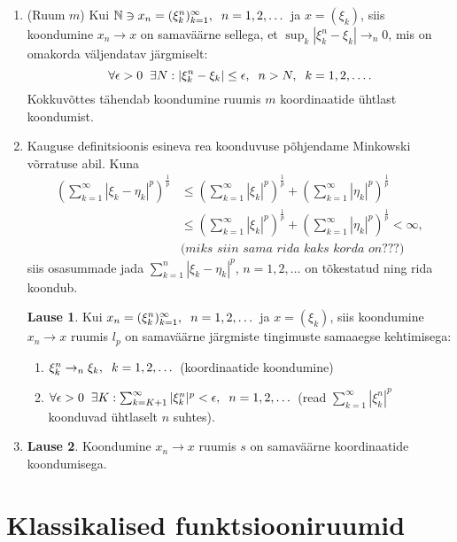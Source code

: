 \documentclass{article}[12pt]
\newcommand{\h}{\hspace{0.2cm}}
\newcommand{\N}{\mathbb{N}}
\theoremstyle{definition}
\theoremstyle{definition}
\theoremstyle{definition}
\newtheorem{lause}{Lause}[section]
\theoremstyle{break}
\begin{document}
\begin{enumerate}
	\item (Ruum $m$) Kui $\N\ni x_n=(\xi_k^n)_{k=1}^\infty,\h n=1,2,\dots$ ja $x=(\xi_k)$, siis koondumine $x_n\rightarrow x$ on samaväärne sellega, et $\sup_k |\xi_k^n-\xi_k| \rightarrow_n 0$, mis on omakorda väljendatav järgmiselt:
	\[
		\forall \epsilon > 0 \h \exists N: |\xi_k^n-\xi_k|\leq \epsilon,\h n>N,\h k=1,2,\dots .
	\]
	Kokkuvõttes tähendab koondumine ruumis $m$ koordinaatide ühtlast koondumist.
	\setcounter{enumi}{3}
	\item Kauguse definitsioonis esineva rea koonduvuse põhjendame Minkowski võrratuse abil.
	Kuna
	\begin{align*}
		\left( \sum_{k=1}^\infty |\xi_k-\eta_k|^p \right)^\frac{1}{p} &\leq \left( \sum_{k=1}^\infty |\xi_k|^p \right)^\frac{1}{p} + \left( \sum_{k=1}^\infty |\eta_k|^p \right)^\frac{1}{p} \\
		&\leq \left( \sum_{k=1}^\infty |\xi_k|^p \right)^\frac{1}{p} + \left( \sum_{k=1}^\infty |\eta_k|^p \right)^\frac{1}{p} < \infty, \\
		&\textit{(miks siin sama rida kaks korda on???)}
	\end{align*}
	siis osasummade jada $\sum_{k=1}^n |\xi_k-\eta_k|^p$, $n=1,2,\dots$ on tõkestatud ning rida koondub.
	\begin{lause}
		Kui $x_n=(\xi_k^n)_{k=1}^\infty,\h n=1,2,\dots$ ja $x=(\xi_k)$, siis koondumine $x_n\rightarrow x$ ruumis $l_p$ on samaväärne järgmiste tingimuste samaaegse kehtimisega:
		\begin{enumerate}
			\item $\xi_k^n \rightarrow_n \xi_k,\h k=1,2,\dots$ (koordinaatide koondumine)
			\item $\forall \epsilon > 0\h\exists K: \sum_{k=K+1}^\infty |\xi_k^n|^p<\epsilon,\h n=1,2,\dots$ (read $\sum_{k=1}^\infty |\xi_k^n|^p$ koonduvad ühtlaselt $n$ suhtes).
		\end{enumerate}
	\end{lause}
	\item \begin{lause}
		Koondumine $x_n\rightarrow x$ ruumis $s$ on samaväärne koordinaatide koondumisega.
	\end{lause}
\end{enumerate}

\section{Klassikalised funktsiooniruumid}
\end{document}
